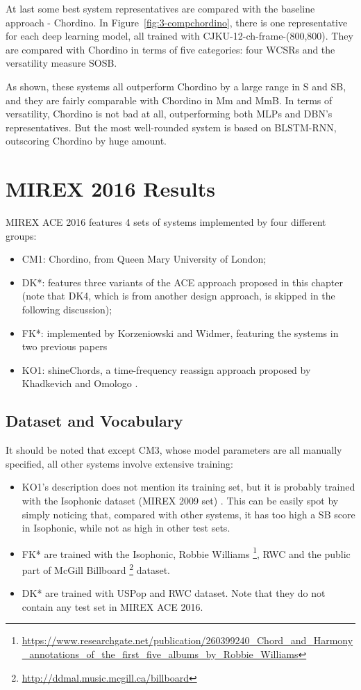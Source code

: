 At last some best system representatives are compared with the baseline approach - Chordino. In Figure~\ref{fig:3-compchordino}, there is one representative for each deep learning model, all trained with CJKU-12-ch-frame-(800,800). They are compared with Chordino in terms of five categories: four WCSRs and the versatility measure SOSB.

As shown, these systems all outperform Chordino by a large range in S and SB, and they are fairly comparable with Chordino in Mm and MmB. In terms of versatility, Chordino is not bad at all, outperforming both MLPs and DBN's representatives. But the most well-rounded system is based on BLSTM-RNN, outscoring Chordino by huge amount.

\section{MIREX 2016 Results}
MIREX ACE 2016 features 4 sets of systems implemented by four different groups:
\begin{itemize}
\item CM1: Chordino, from Queen Mary University of London;
\item DK*: features three variants of the ACE approach proposed in this chapter (note that DK4, which is from another design approach, is skipped in the following discussion);
\item FK*: implemented by Korzeniowski and Widmer, featuring the systems in two previous papers \cite{Korzeniowski2016feature,Korzeniowski2016convolutional}
\item KO1: shineChords, a time-frequency reassign approach proposed by Khadkevich and Omologo \cite{khadkevich2011time}.
\end{itemize}

\subsection{Dataset and Vocabulary}
It should be noted that except CM3, whose model parameters are all manually specified, all other systems involve extensive training:
\begin{itemize}
\item KO1's description does not mention its training set, but it is probably trained with the Isophonic dataset (MIREX 2009 set) \cite{burgoyne2014comparative}. This can be easily spot by simply noticing that, compared with other systems, it has too high a SB score in Isophonic, while not as high in other test sets.

\item FK* are trained with the Isophonic, Robbie Williams \footnote{\url{https://www.researchgate.net/publication/260399240\_Chord\_and\_Harmony\_annotations\_of\_the\_first\_five\_albums\_by\_Robbie\_Williams}}, RWC and the public part of McGill Billboard \footnote{\url{http://ddmal.music.mcgill.ca/billboard}} dataset.

\item DK* are trained with USPop and RWC dataset. Note that they do not contain any test set in MIREX ACE 2016.
\end{itemize}

